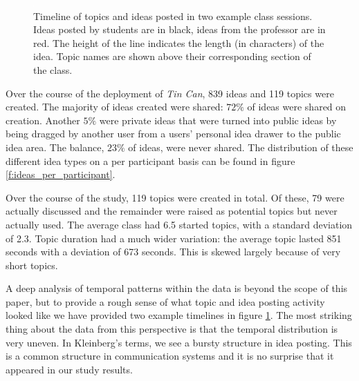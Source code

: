 \begin{figure}[p]
\centering
\includegraphics{figures/tincan/timeline.pdf}
\caption{Timeline of topics and ideas posted in two example class sessions. Ideas posted by students are in black, ideas from the professor are in red. The height of the line indicates the length (in characters) of the idea. Topic names are shown above their corresponding section of the class.}
\label{f:class_timelines}
\end{figure}


Over the course of the deployment of \emph{Tin Can}, 839 ideas and 119 topics were created. The  majority of ideas created were shared: $72\%$ of ideas were shared on creation. Another $5\%$ were private ideas that were turned into public ideas by being dragged by another user from a users' personal idea drawer to the public idea area. The balance, $23\%$ of ideas, were never shared. The distribution of these different idea types on a per participant basis can be found in figure \ref{f:ideas_per_participant}. 

Over the course of the study, 119 topics were created in total. Of these, 79 were actually discussed and the remainder were raised as potential topics but never actually used. The average class had 6.5 started topics, with a standard deviation of 2.3. Topic duration had a much wider variation: the average topic lasted 851 seconds with a deviation of 673 seconds. This is skewed largely because of very short topics. 

A deep analysis of temporal patterns within the data is beyond the scope of this paper, but to provide a rough sense of what topic and idea posting activity looked like we have provided two example timelines in figure \ref{f:class_timelines}. The most striking thing about the data from this perspective is that the temporal distribution is very uneven. In Kleinberg's terms, we see a bursty structure \citep{Kleinberg:2003ej} in idea posting. This is a common structure in communication systems and it is no surprise that it appeared in our study results. 






